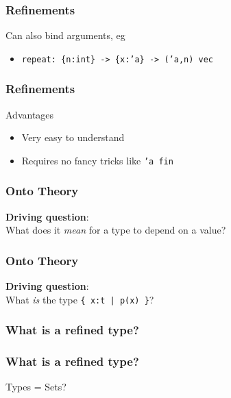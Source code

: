 \documentclass[usenames,dvipsnames]{beamer}
\begin{document}

\begin{frame}
  \frametitle{Refinements}
  Can also bind arguments, eg
  \begin{itemize}
    \item \texttt{repeat: \{n:int\} -> \{x:'a\} -> ('a,n) vec}
  \end{itemize}
\end{frame}


\begin{frame}
  \frametitle{Refinements}

  \begin{block}{Advantages}
    \begin{itemize}
      \item Very easy to understand
      \item Requires no fancy tricks like \texttt{'a fin}
    \end{itemize}
  \end{block}
\end{frame}


\begin{frame}
  \frametitle{Onto Theory}

  \textbf{Driving question}: \\
  What does it \emph{mean} for a type to depend on a value?
\end{frame}


\begin{frame}
  \frametitle{Onto Theory}

  \textbf{Driving question}: \\
  What \emph{is} the type \texttt{\{ x:t | p(x) \}}?
\end{frame}


\begin{frame}
  \frametitle{What is a refined type?}

  \phantom{Types = Sets?}
\end{frame}


\begin{frame}
  \frametitle{What is a refined type?}

  {Types = Sets?}
\end{frame}
\end{document}

